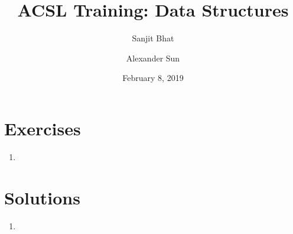 \documentclass[11pt,letterpaper]{article}
\title{ACSL Training: Data Structures}
\author{Sanjit Bhat \and Alexander Sun}
\date{February 8, 2019}
\begin{document}
    \maketitle
    \section{Exercises}
    \begin{enumerate}
        \item
    \end{enumerate}

    \newpage
    \section{Solutions}
    \begin{enumerate}
        \item
    \end{enumerate}
\end{document}
